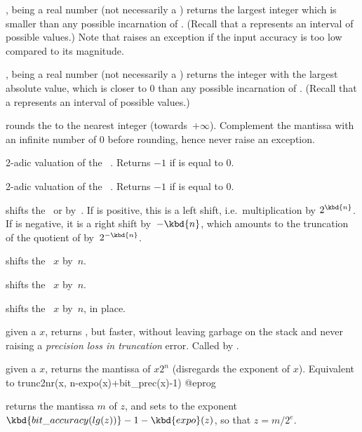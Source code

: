 ,  being a real number (not necessarily a
) returns the largest integer which is smaller than any possible
incarnation of . (Recall that a  represents an interval of
possible values.) Note that  raises an exception if the input
accuracy is too low compared to its magnitude.

,  being a real number (not necessarily a
) returns the integer with the largest absolute value, which is closer
to $0$ than any possible incarnation of . (Recall that a 
represents an interval of possible values.)

 rounds the   to the nearest
integer (towards~$+\infty$). Complement the mantissa with an infinite number
of $0$ before rounding, hence never raise an exception.


 2-adic valuation of the ~. Returns
$-1$ if  is equal to 0.

 2-adic valuation of the ~. Returns $-1$
if  is equal to 0.

 shifts the~ or
  by~. If  is positive, this is a left shift,
i.e.~multiplication by $2^{\kbd{n}}$. If  is negative, it is a right
shift by~$-\kbd{n}$, which amounts to the truncation of the quotient of 
by~$2^{-\kbd{n}}$.

 shifts the ~$x$ by~$n$.

 shifts the ~$x$ by~$n$.

 shifts the ~$x$ by~$n$,
in place.

 given a  $x$, returns
, but faster, without leaving garbage on the stack
and never raising a \emph{precision loss in truncation} error.
Called by .

 given a  $x$, returns
the mantissa of $x 2^n$ (disregards the exponent of $x$). Equivalent to
\bprog
  trunc2nr(x, n-expo(x)+bit_prec(x)-1)
@eprog

 returns the mantissa $m$ of $z$, and
sets  to the exponent $\kbd{bit\_accuracy(lg(z))}-1-\kbd{expo}(z)$,
so that $z = m / 2^e$.

